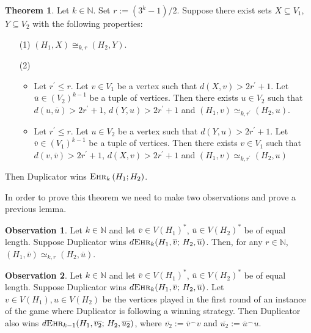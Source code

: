 \documentclass[12pt,notitlepage,a4paper]{article}
\theoremstyle{definition}
\newtheorem{theorem}{Theorem}[section]
\newtheorem{obs}{Observation}[section]
\newcommand{\N}{\mathbb{N}}
\newcommand{\ehr}{\textsc{Ehr}}
\begin{document}
\begin{theorem}\label{thm:DuplicatorAux}
	Let $k\in \N$.
	Set $r:=(3^k-1)/2$.
	Suppose there exist
	sets $X\subseteq V_1$, $Y\subseteq V_2$ with the 
	following properties:
	\begin{enumerate}
		\item[(1)] $(H_1,X)\cong_{k,r} (H_2,Y)$.
		\item[(2)]
		\begin{itemize}
			\item Let $r^\prime\leq r$. Let $v\in V_1$ be
			a vertex such that $d(X,v)> 2r^\prime + 1$. Let 
			$\overline{u}\in (V_2)^{k-1}$ be a tuple of vertices. 
			Then there exists $u\in V_2$ such that 
			$d(u,\overline{u})>2r^\prime+1$,
			$d(Y,u)>2r^\prime +1$ and
			$(H_1,v)\simeq_{k,r^\prime} (H_2,u)$.	
			\item Let $r^\prime\leq r$. Let $u\in V_2$ be
			a vertex such that $d(Y,u)> 2r^\prime + 1$. Let 
			$\overline{v}\in (V_1)^{k-1}$ be a tuple of vertices. 
			Then there exists $v\in V_1$ such that 
			$d(v,\overline{v})>2r^\prime+1$,
			$d(X,v)>2r^\prime +1$ and
			$(H_1,v)\simeq_{k,r^\prime} (H_2,u)$
		\end{itemize}
	\end{enumerate}
	Then Duplicator wins $\ehr_k\left(H_1;H_2\right)$.
\end{theorem}

In order to prove this theorem we need to make two observations
and prove a previous lemma. 

\begin{obs} \label{obs1}
	Let $k\in \N$ and let
	$\overline{v}\in V(H_1)^*$, $\overline{u}\in V(H_2)^*$ be of equal length. Suppose
	Duplicator wins $d\ehr_k(H_1,\overline{v}; \, H_2,\overline{u})$.
	Then, for any $r\in \N$, $(H_1, \overline{v})\simeq_{k,r} 
	(H_2,\overline{u})$. 
\end{obs}



\begin{obs} \label{obs2}
	Let $k\in \N$ and let
	$\overline{v}\in V(H_1)^*$, $\overline{u}\in V(H_2)^*$ be of equal length. Suppose 
	Duplicator wins $d\ehr_k(H_1,\overline{v};\,H_2,\overline{u})$. 
	Let $v\in V(H_1),u\in V(H_2)$ be the vertices
	played in the first round of an instance of the game 
	where Duplicator is following a winning strategy. Then 
	Duplicator also wins $d\ehr_{k-1}(H_1,\overline{v_2}; \,
	H_2,\overline{u_2})$, where $\overline{v_2}:=\overline{v}^\smallfrown v$
	and $\overline{u_2}:=\overline{u}^\smallfrown u$.
\end{obs}
\end{document}
